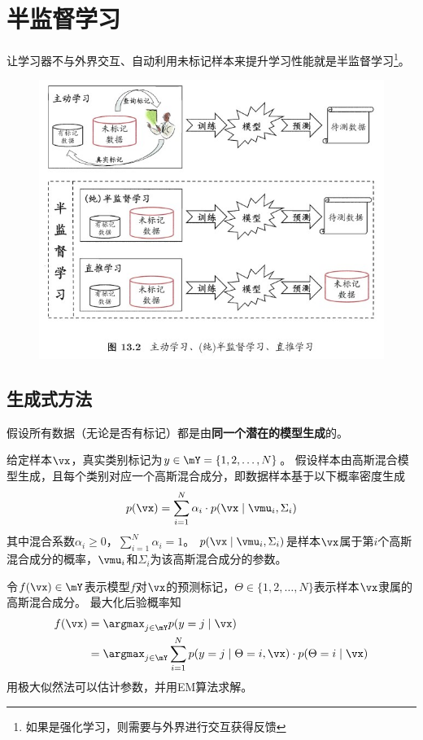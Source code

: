 
\section{半监督学习}
让学习器不与外界交互、自动利用未标记样本来提升学习性能就是半监督学习\footnote{如果是强化学习，则需要与外界进行交互获得反馈}。

\begin{figure}[H]
\centering
\includegraphics[width=0.8\linewidth]{fig/semi-supervised_learning.jpg}
\end{figure}

\subsection{生成式方法}
假设所有数据（无论是否有标记）都是由\textbf{同一个潜在的模型生成}的。

给定样本$\vx$，真实类别标记为$y\in\mY=\{1,2,\ldots,N\}$。
假设样本由高斯混合模型生成，且每个类别对应一个高斯混合成分，即数据样本基于以下概率密度生成
\[p(\vx)=\sum_{i=1}^N\alpha_i\cdot p(\vx\mid\vmu_i,\Sigma_i)\]
其中混合系数$\alpha_i\geq 0$，$\sum_{i=1}^N\alpha_i=1$。
$p(\vx\mid\vmu_i,\Sigma_i)$是样本$\vx$属于第$i$个高斯混合成分的概率，$\vmu_i$和$\Sigma_i$为该高斯混合成分的参数。

令$f(\vx)\in\mY$表示模型$f$对$\vx$的预测标记，$\Theta\in\{1,2,\ldots,N\}$表示样本$\vx$隶属的高斯混合成分。
最大化后验概率知
\[\begin{aligned}
f(\vx) &= \argmax_{j\in\mY}p(y=j\mid\vx)\\
&= \argmax_{j\in\mY}\sum_{i=1}^Np(y=j\mid\Theta=i,\vx)\cdot p(\Theta=i\mid\vx)
\end{aligned}\]
用极大似然法可以估计参数，并用EM算法求解。

